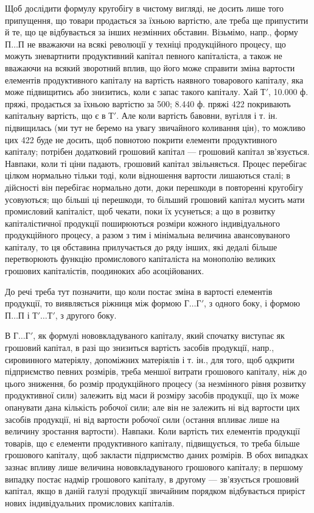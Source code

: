 Щоб дослідити формулу кругобігу в чистому вигляді, не досить лише
того припущення, що товари продається за їхньою вартістю, але треба
ще припустити й те, що це відбувається за інших незмінних обставин.
Візьмімо, напр., форму $П\dots{} П$ не вважаючи на всякі революції у техніці
продукційного процесу, що можуть зневартнити продуктивний капітал певного
капіталіста, а також не вважаючи на всякий зворотний вплив, що
його може справити зміна вартости елементів продуктивного капіталу на
вартість наявного товарового капіталу, яка може підвищитись або
знизитись, коли є запас такого капіталу. Хай $Т'$, \num{10.000} ф. пряжі,
продається за їхньою вартістю за 500; \num{8.440} ф. пряжі \deq{}
422 покривають капітальну вартість, що є в $Т'$. Але коли
вартість бавовни, вугілля і т. ін. підвищилась (ми тут не беремо на увагу
звичайного коливання цін), то можливо цих 422 буде не досить,
щоб повнотою покрити елементи продуктивного капіталу; потрібен додатковий
грошовий капітал — грошовий капітал зв’язується. Навпаки, коли
ті ціни падають, грошовий капітал звільняється. Процес перебігає цілком
нормально тільки тоді, коли відношення вартости лишаються сталі; в дійсності
він перебігає нормально доти, доки перешкоди в повторенні кругобігу
усовуються; що більші ці перешкоди, то більший грошовий капітал
мусить мати промисловий капіталіст, щоб чекати, поки їх усунеться; а що в
розвитку капіталістичної продукції поширюються розміри кожного індивідуального
продукційного процесу, а разом з тим і мінімальна величина
авансовуваного капіталу, то ця обставина прилучається до ряду
інших, які дедалі більше перетворюють функцію промислового капіталіста
на монополію великих грошових капіталістів, поодиноких або
асоційованих.

До речі треба тут позначити, що коли постає зміна в вартості елементів
продукції, то виявляється ріжниця між формою $Г\dots{} Г'$, з одного
боку, і формою $П\dots{}П$ і $Т'\dots{}Т'$, з другого боку.

В $Г\dots{} Г'$, як формулі нововкладуваного капіталу, який спочатку
виступає як грошовий капітал, в разі що знизиться вартість засобів
продукції, напр., сировинного матеріялу, допоміжних матеріялів і т. ін., для
того, щоб одкрити підприємство певних розмірів, треба меншої витрати
грошового капіталу, ніж до цього зниження, бо розмір продукційного
процесу (за незмінного рівня розвитку продуктивної сили) залежить від
маси й розміру засобів продукції, що їх може опанувати дана кількість
робочої сили; але він не залежить ні від вартости цих засобів продукції,
ні від вартости робочої сили (остання впливає лише на величину
зростання вартости). Навпаки. Коли вартість тих елементів продукції товарів,
що є елементи продуктивного капіталу, підвищується, то треба
більше грошового капіталу, щоб закласти підприємство даних розмірів.
В обох випадках зазнає впливу лише величина нововкладуваного грошового
капіталу; в першому випадку постає надмір грошового капіталу, в
другому — зв’язується грошовий капітал, якщо в даній галузі продукції
звичайним порядком відбувається приріст нових індивідуальних промислових
капіталів.

